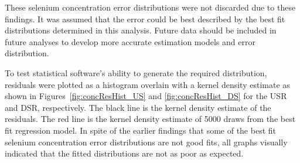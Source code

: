 \begin{linenumbers}
These selenium concentration error distributions were not discarded due to these findings.  It was assumed that the error could be best described by the best fit distributions determined in this analysis.  Future data should be included in future analyses to develop more accurate estimation models and error distribution.

To test statistical software's ability to generate the required distribution, residuals were plotted as a histogram overlain with a kernel density estimate as shown in Figures~\ref{fig:concResHist_US} and \ref{fig:concResHist_DS} for the USR and DSR, respectively.  The black line is the kernel density estimate of the residuals.  The red line is the kernel density estimate of 5000 draws from the best fit regression model.  In spite of the earlier findings that some of the best fit selenium concentration error distributions are not good fits, all graphs visually indicated that the fitted distributions are not as poor as expected.


\end{linenumbers}
